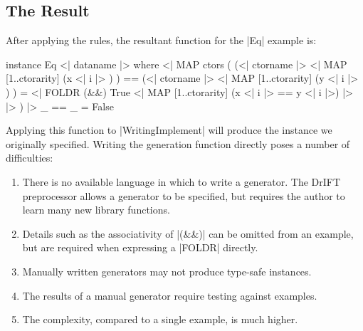 \documentclass{llncs}
\begin{document}
\subsection{The Result}

After applying the rules, the resultant function for the |Eq| example is:

\begin{code}
instance Eq \? <| dataname |> where
    <| MAP ctors (
        (<| ctorname |> \? <| MAP [1..ctorarity] (x <| i |> ) ) ==
        (<| ctorname |> \? <| MAP [1..ctorarity] (y <| i |> ) ) =
        <| FOLDR (&&) True \? <| MAP [1..ctorarity] (x <| i |> == y <| i |>) |> |>
    ) |>
    _ == _ = False
\end{code}

Applying this function to |WritingImplement| will produce the instance we originally specified. Writing the generation function directly poses a number of difficulties:

\begin{enumerate}
\item There is no available language in which to write a generator. The DrIFT preprocessor \cite{drift} allows a generator to be specified, but requires the author to learn many new library functions.
\item Details such as the associativity of |(&&)| can be omitted from an example, but are required when expressing a |FOLDR| directly.
\item Manually written generators may not produce type-safe instances.
\item The results of a manual generator require testing against examples.
\item The complexity, compared to a single example, is much higher.
\end{enumerate}
\end{document}
